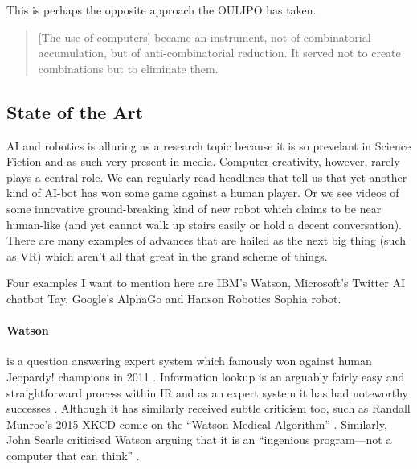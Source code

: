 This is perhaps the opposite approach the \ac{OULIPO} has taken.

\begin{quotation}
  [The use of computers] became an instrument, not of combinatorial accumulation, but of anti-combinatorial reduction. It served not to create combinations but to eliminate them. 
\end{quotation}


\subsection{State of the Art}

\ac{AI} and robotics is alluring as a research topic because it is so prevelant in Science Fiction and as such very present in media. Computer creativity, however, rarely plays a central role. We can regularly read headlines that tell us that yet another kind of \ac{AI}-bot has won some game against a human player. Or we see videos of some innovative ground-breaking kind of new robot which claims to be near human-like (and yet cannot walk up stairs easily or hold a decent conversation). There are many examples of advances that are hailed as the next big thing (such as \ac{VR}) which aren't all that great in the grand scheme of things. 

Four examples I want to mention here are IBM's Watson, Microsoft's Twitter \ac{AI} chatbot Tay, Google's AlphaGo and Hanson Robotics Sophia robot.

\paragraph{Watson} is a question answering expert system which famously won against human Jeopardy! champions in 2011 \autocite{IBM2016}. Information lookup is an arguably fairly easy and straightforward process within \ac{IR} and as an expert system it has had noteworthy successes \autocite{Fingas2016}. Although it has similarly received subtle criticism too, such as Randall Munroe's 2015 XKCD comic on the ``Watson Medical Algorithm'' \autocite*{Munroe2015}. Similarly, John Searle criticised Watson arguing that it is an ``ingenious program---not a computer that can think'' \autocite*{Searle2011}.

